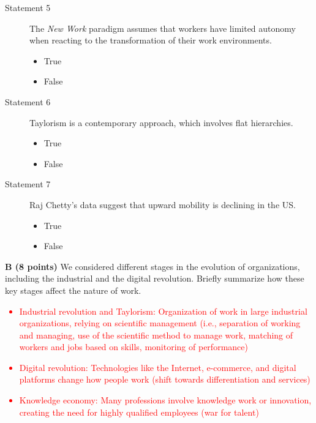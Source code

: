 \documentclass[12pt]{scrartcl}
\begin{document}
\begin{description}
	\item[Statement 5] The \textit{New Work} paradigm assumes that workers have limited autonomy when reacting to the transformation of their work environments.

	\begin{multicols}{2}
		\begin{itemize}[label={\Square}]
			\item True
			\item[\checkmark] False
		\end{itemize}
	\end{multicols}

	\item[Statement 6] Taylorism is a contemporary approach, which involves flat hierarchies.

	\begin{multicols}{2}
		\begin{itemize}[label={\Square}]
			\item True
			\item[\checkmark] False
		\end{itemize}
	\end{multicols}


	\item[Statement 7 ] Raj Chetty's data suggest that upward mobility is declining in the US.

	\begin{multicols}{2}
		\begin{itemize}[label={\Square}]
			\item[\checkmark] True
			\item False
		\end{itemize}
	\end{multicols}


\end{description}

\newpage

\textbf{B (8 points)} We considered different stages in the evolution of organizations, including the industrial and the digital revolution. Briefly summarize how these key stages affect the nature of work.

\textcolor{red}{
	\begin{itemize}
		\item Industrial revolution and Taylorism: Organization of work in large industrial organizations, relying on scientific management (i.e., separation of working and managing, use of the scientific method to manage work, matching of workers and jobs based on skills, monitoring of performance)
		\item Digital revolution: Technologies like the Internet, e-commerce, and digital platforms change how people work (shift towards differentiation and services)
		\item Knowledge economy: Many professions involve knowledge work or innovation, creating the need for highly qualified employees (war for talent)
	\end{itemize}	
}
\end{document}
